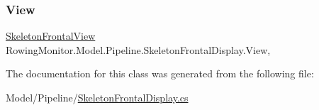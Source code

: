 \mbox{\label{class_rowing_monitor_1_1_model_1_1_pipeline_1_1_skeleton_frontal_display_a8be39be7a7348b853f17e4fbd59e8530}} 
\subsubsection{\texorpdfstring{View}{View}}
{\footnotesize\ttfamily \hyperlink{class_rowing_monitor_1_1_view_1_1_skeleton_frontal_view}{Skeleton\+Frontal\+View} Rowing\+Monitor.\+Model.\+Pipeline.\+Skeleton\+Frontal\+Display.\+View\hspace{0.3cm}{\ttfamily [get]}, {\ttfamily [set]}}



The documentation for this class was generated from the following file\+:\begin{DoxyCompactItemize}
\item 
Model/\+Pipeline/\hyperlink{_skeleton_frontal_display_8cs}{Skeleton\+Frontal\+Display.\+cs}\end{DoxyCompactItemize}
